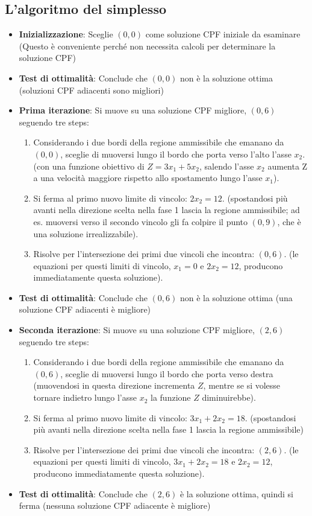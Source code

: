 \documentclass[12pt,a4paper]{article}
\begin{document}
\subsection{L'algoritmo del simplesso}
\begin{itemize}
\item \textbf{Inizializzazione}: Sceglie $(0,0)$ come soluzione CPF iniziale da esaminare (Questo è conveniente perché non necessita calcoli per determinare la soluzione CPF)
\item \textbf{Test di ottimalità}: Conclude che $(0,0)$ non è la soluzione ottima (soluzioni CPF adiacenti sono migliori)
\item \textbf{Prima iterazione}: Si muove su una soluzione CPF migliore, $(0,6)$ seguendo tre steps:
\begin{enumerate}
\item Considerando i due bordi della regione ammissibile che emanano da $(0, 0)$, sceglie di muoversi lungo il bordo che porta verso l'alto l'asse $x_2$. (con una funzione obiettivo di $Z = 3x_1 + 5x_2$, salendo l'asse $x_2$ aumenta Z a una velocità maggiore rispetto allo spostamento lungo l'asse $x_1$).
\item Si ferma al primo nuovo limite di vincolo: $2x_2 = 12$. (spostandosi più avanti nella direzione scelta nella fase 1 lascia la regione ammissibile; ad es. muoversi verso il secondo vincolo gli fa colpire il punto $(0, 9)$, che è una soluzione irrealizzabile).
\item Risolve per l'intersezione dei primi due vincoli che incontra: $(0, 6)$. (le equazioni per questi limiti di vincolo, $x_1 = 0$ e $2x_2 = 12$, producono immediatamente questa soluzione).
\end{enumerate}
\item \textbf{Test di ottimalità}: Conclude che $(0,6)$ non è la soluzione ottima (una soluzione CPF adiacenti è migliore)
\item \textbf{Seconda iterazione}: Si muove su una soluzione CPF migliore, $(2,6)$ seguendo tre steps:
\begin{enumerate}
\item Considerando i due bordi della regione ammissibile che emanano da $(0, 6)$, sceglie di muoversi lungo il bordo che porta verso destra (muovendosi in questa direzione incrementa $Z$, mentre se si volesse tornare indietro lungo l'asse $x_2$ la funzione $Z$ diminuirebbe).
\item Si ferma al primo nuovo limite di vincolo: $3x_1+2x_2 = 18$. (spostandosi più avanti nella direzione scelta nella fase 1 lascia la regione ammissibile)
\item Risolve per l'intersezione dei primi due vincoli che incontra: $(2, 6)$. (le equazioni per questi limiti di vincolo, $3x_1 + 2x_2 = 18$ e $2x_2 = 12$, producono immediatamente questa soluzione).
\end{enumerate}
\item \textbf{Test di ottimalità}: Conclude che $(2,6)$ è la soluzione ottima, quindi si ferma (nessuna soluzione CPF adiacente è migliore)
\end{itemize}
\end{document}
